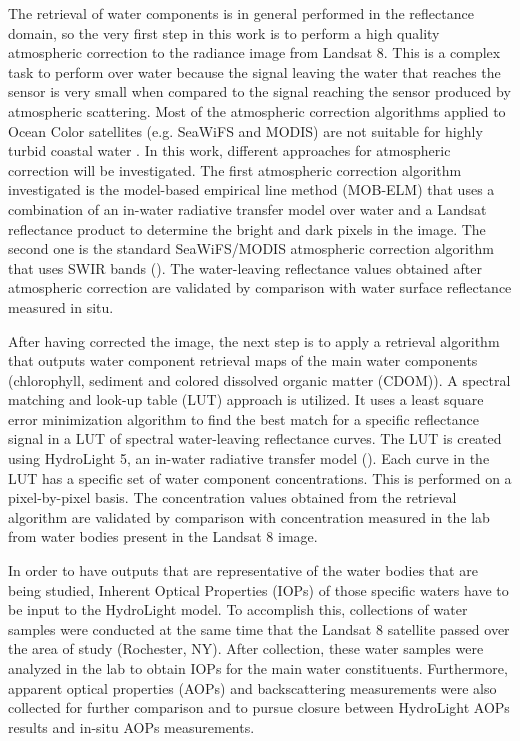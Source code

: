 The retrieval of water components is in general performed in the reflectance domain, so the very first step in this work is to perform a high quality atmospheric correction to the radiance image from Landsat 8. This is a complex task to perform over water because the signal leaving the water that reaches the sensor is very small when compared to the signal reaching the sensor produced by atmospheric scattering. Most of the atmospheric correction algorithms applied to Ocean Color satellites (e.g. SeaWiFS and MODIS) are not suitable for highly turbid coastal water \cite{Patt2003}. In this work, different approaches for atmospheric correction will be investigated. The first atmospheric correction algorithm investigated is the model-based empirical line method (MOB-ELM) that uses a combination of an in-water radiative transfer model over water and a Landsat reflectance product to determine the bright and dark pixels in the image. The second one is the standard SeaWiFS/MODIS atmospheric correction algorithm that uses SWIR bands (\cite{Wang:2007}). The water-leaving reflectance values obtained after atmospheric correction are validated by comparison with water surface reflectance measured in situ. 

After having corrected the image, the next step is to apply a retrieval algorithm that outputs water component retrieval maps of the main water components (chlorophyll, { sediment} and colored dissolved organic matter (CDOM)). A spectral matching and look-up table (LUT) approach is utilized. It uses a least square error minimization algorithm to find the best match for a specific reflectance signal in a LUT of spectral water-leaving reflectance curves. The LUT is created using HydroLight 5, an in-water radiative transfer model (\cite{Mobley:2005}). Each curve in the LUT has a specific set of water component concentrations. This is performed on a pixel-by-pixel basis. The concentration values obtained from the retrieval algorithm are validated by comparison with concentration measured in the lab from water bodies present in the Landsat 8 image.

In order to have outputs that are representative of the water bodies that are being studied, Inherent Optical Properties (IOPs) of those specific waters have to be input to the HydroLight model. To accomplish this, collections of water samples were conducted at the same time that the Landsat 8 satellite passed over the area of study (Rochester, NY). After collection, these water samples were analyzed in the lab to obtain IOPs for the main water constituents. Furthermore, apparent optical properties (AOPs) and backscattering measurements were also collected for further comparison and to pursue closure between HydroLight AOPs results and in-situ AOPs measurements.